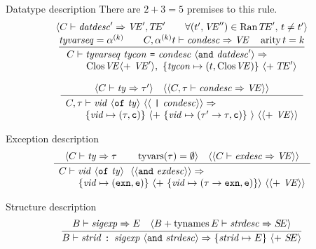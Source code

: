 \begin{inference-rule}{Datatype description}
There are $2+3=5$ premises to this rule.
\begin{equation}\label{rule:static-modules:datdesc}
  \vcenter{\infer{\begin{array}{l}\C\ts\newdatdescription\ra\\
    \qquad\cl{}{\VE} \optional{ +\ \VE'},\
       \{\tycon\mapsto(t,\cl{}{\VE})\}\ \optional{ +\ \TE'}
      \end{array}}
  {\deduce{\tyvarseq = \alphak\qquad\C,\alphakt\ts\condesc\ra\VE
           \quad\arity \t  =  k}
    {\optional{\C\ts\datdesc'\ra\VE',\TE'\qquad \forall(\t',\VE'')\in\Ran\TE',\,\t\neq\t'}}}}
\end{equation}
\end{inference-rule}

\begin{inference-rule}{}
\begin{equation}\label{rule:static-modules:}
\vcenter{\infer{\begin{array}{l}
      \C,\tau\ts\longconviddescription\ra\\
      \qquad\{\vid\mapsto(\tau,\isc)\}\
     \optional{ +\ \{\vid\mapsto(\tau'\to\tau,\isc)\}\ }\
      \optional{\optional{ +\ \VE}}
      \end{array}}
  {\optional{\C\ts\ty\ra\tau'}
    & \optional{\optional{\C,\tau\ts\condesc\ra\VE}}}}
\end{equation}
\end{inference-rule}

\begin{inference-rule}{Exception description}
\begin{equation}\label{rule:static-modules:exndesc}
\vcenter{\infer{\begin{array}{l}
        \C\ts\exnviddescriptiona\ra\\
        \quad\quad\{\vid\mapsto(\EXCN,\ise)\}\ \optional{ +\ \{\vid\mapsto(\tau\rightarrow\EXCN,\ise)\}}\ \optional{\optional{ +\ \VE}} 
       \end{array}}
  {\optional{\C\ts\ty\ra\tau\qquad\TyVarsFcn(\tau)=\emptyset}
    & \optional{\optional{\C\ts\exndesc\ra\VE}}}}
\end{equation}
\end{inference-rule}

\begin{inference-rule}{Structure description}
\begin{equation}\label{rule:static-modules:strdesc}
\vcenter{\infer{\B\ts\strdescription\ra\{\strid\mapsto\E\}\ \optional{ +\ \SE}}
  {\B\ts\sigexp\ra\E
    & \optional{\B + \TyNamesFcn\E\ts\strdesc\ra\SE}}}
\end{equation}
\end{inference-rule}

